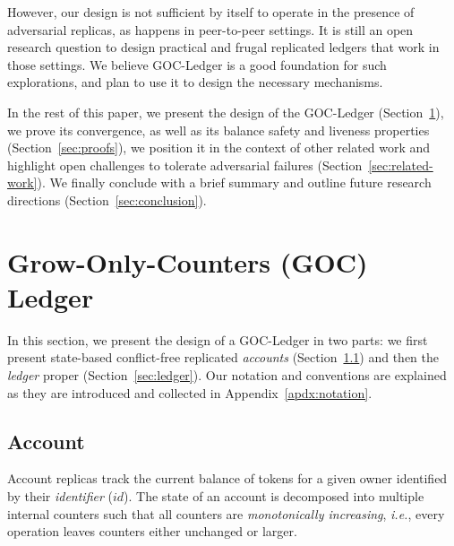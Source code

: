 \documentclass[9pt]{article}   	%
\begin{document}
However, our design is not sufficient by itself to operate in the presence of adversarial replicas, as happens in peer-to-peer settings. It is still an open research question to design practical and frugal replicated ledgers that work in those settings. We believe GOC-Ledger is a good foundation for such explorations, and plan to use it to design the necessary mechanisms. 

In the rest of this paper,  we present the design of the GOC-Ledger (Section~\ref{sec:design}), we prove its convergence, as well as its balance safety and liveness properties (Section~\ref{sec:proofs}), we position it in the context of other related work  and highlight open challenges to tolerate adversarial failures (Section~\ref{sec:related-work}). We finally conclude with a brief summary and outline future research directions (Section~\ref{sec:conclusion}).

\newpage

\section{Grow-Only-Counters (GOC) Ledger}
\label{sec:design}

In this section, we present the design of a GOC-Ledger in two parts: we first present state-based conflict-free replicated \textit{accounts} (Section~\ref{sec:account}) and then the \textit{ledger} proper (Section~\ref{sec:ledger}). Our notation and conventions are explained as they are introduced and collected in Appendix~\ref{apdx:notation}.

\subsection{Account}
\label{sec:account}

Account replicas track the current balance of tokens for a given owner identified by their \textit{identifier} ($id$). The state of an account is decomposed into multiple internal counters such that all counters are \textit{monotonically increasing}, \textit{i.e.}, every operation leaves counters either unchanged or larger. 
\end{document}
